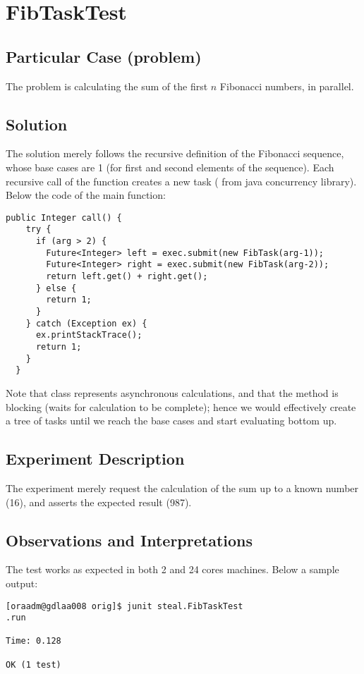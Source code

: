 \section{\textbf{FibTaskTest}}

\subsection{Particular Case (problem)}
The problem is calculating the sum of the first $n$ Fibonacci numbers,
in parallel. 

\subsection{Solution}
The solution merely follows the recursive definition of the Fibonacci
sequence, whose base cases are 1 (for first and second elements of the
sequence). Each recursive call of the function creates a new task
( from java concurrency library). Below the code of the main
function: \\

\begin{lstlisting}[style=numbers]
  public Integer call() {
    try {
      if (arg > 2) {
        Future<Integer> left = exec.submit(new FibTask(arg-1));
        Future<Integer> right = exec.submit(new FibTask(arg-2));
        return left.get() + right.get();
      } else {
        return 1;
      }
    } catch (Exception ex) {
      ex.printStackTrace();
      return 1;
    }
  }
\end{lstlisting}
\hfill

Note that  class represents asynchronous calculations, and
that the  method is blocking (waits for calculation to be
complete); hence we would effectively create a  tree of tasks until we
reach the base cases and start evaluating bottom up.

\subsection{Experiment Description}
The experiment merely request the calculation of the sum up to a known
number (16), and asserts the expected result (987).

\subsection{Observations and Interpretations}
The test works as expected in both 2 and 24 cores machines. Below a
sample output: \\

\begin{verbatim}
[oraadm@gdlaa008 orig]$ junit steal.FibTaskTest
.run

Time: 0.128

OK (1 test)
\end{verbatim}
\hfill

